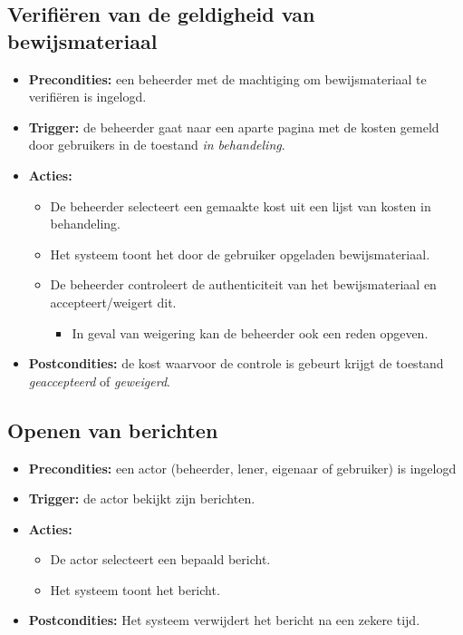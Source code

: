 \documentclass[]{article}
\begin{document}
\subsection{Verifi\"{e}ren van de geldigheid van bewijsmateriaal}
\begin{itemize}
\item \textbf{Precondities:} een beheerder met de machtiging om bewijsmateriaal te verifi\"{e}ren is ingelogd.
\item \textbf{Trigger:} de beheerder gaat naar een aparte pagina met de kosten gemeld door gebruikers in de toestand \emph{in behandeling}.
\item \textbf{Acties:} 
\begin{itemize}
	\item	De beheerder selecteert een gemaakte kost uit een lijst van kosten in behandeling.
	\item 	Het systeem toont het door de gebruiker opgeladen bewijsmateriaal.
	\item	De beheerder controleert de authenticiteit van het bewijsmateriaal en accepteert/weigert dit.
		\begin{itemize}
			\item In geval van weigering kan de beheerder ook een reden opgeven.
		\end{itemize}
\end{itemize}
\item \textbf{Postcondities:} de kost waarvoor de controle is gebeurt krijgt de toestand \emph{geaccepteerd} of \emph{geweigerd}.
\end{itemize}

\subsection{Openen van berichten}
\begin{itemize}
\item \textbf{Precondities:} een actor (beheerder, lener, eigenaar of gebruiker) is ingelogd
\item \textbf{Trigger:} de actor bekijkt zijn berichten.

\item \textbf{Acties:} 
\begin{itemize}
	\item	De actor selecteert een bepaald bericht.
	\item	Het systeem toont het bericht.
\end{itemize}
\item \textbf{Postcondities:} Het systeem verwijdert het bericht na een zekere tijd.
\end{itemize}
\end{document}
